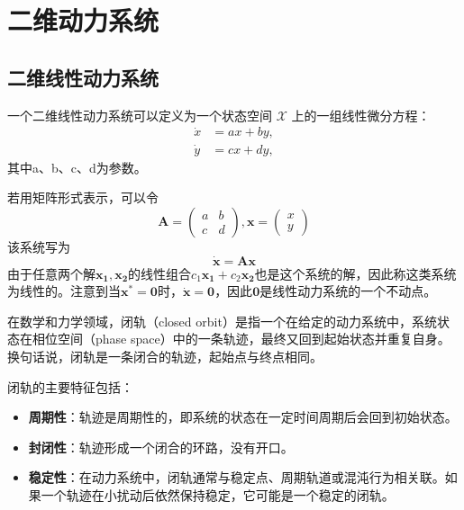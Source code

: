 \section{二维动力系统}
\subsection{二维线性动力系统}
\begin{defn}[二维线性动力系统]
    一个二维线性动力系统可以定义为一个状态空间 $\mathcal{X}$ 上的一组线性微分方程：
    \begin{equation}
        \begin{aligned}
            \dot{x} & = a x + b y, \\
            \dot{y} & = c x + d y,
        \end{aligned}
    \end{equation}
    其中a、b、c、d为参数。
\end{defn}
若用矩阵形式表示，可以令
\begin{equation}
    \mathbf{A}= \begin{pmatrix}
        a & b \\
        c & d
    \end{pmatrix},\mathbf{x}=\begin{pmatrix}
        x \\y
    \end{pmatrix}
\end{equation}
该系统写为
\begin{equation}
    \dot{\mathbf{x}}=\mathbf{A}\mathbf{x}
\end{equation}
由于任意两个解$\mathbf{x_1},\mathbf{x_2}$的线性组合$c_1\mathbf{x_1}+c_2\mathbf{x_2}$也是这个系统的解，因此称这类系统为线性的。注意到当$\mathbf{x^*}=\mathbf{0}$时，$\dot{\mathbf{x}}=\mathbf{0}$，因此$\mathbf{0}$是线性动力系统的一个不动点。
\begin{defn}[闭轨]
    在数学和力学领域，闭轨（closed orbit）是指一个在给定的动力系统中，系统状态在相位空间（phase space）中的一条轨迹，最终又回到起始状态并重复自身。换句话说，闭轨是一条闭合的轨迹，起始点与终点相同。
\end{defn}
闭轨的主要特征包括：
\begin{itemize}
    \item \textbf{周期性}：轨迹是周期性的，即系统的状态在一定时间周期后会回到初始状态。
    \item \textbf{封闭性}：轨迹形成一个闭合的环路，没有开口。
    \item \textbf{稳定性}：在动力系统中，闭轨通常与稳定点、周期轨道或混沌行为相关联。如果一个轨迹在小扰动后依然保持稳定，它可能是一个稳定的闭轨。
\end{itemize}
